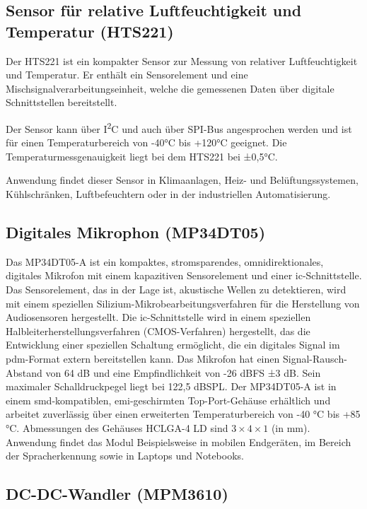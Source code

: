 \subsection{Sensor für relative Luftfeuchtigkeit und Temperatur (HTS221)}

Der HTS221 ist ein kompakter Sensor zur Messung von relativer Luftfeuchtigkeit und Temperatur. Er enthält ein Sensorelement und eine Mischsignalverarbeitungseinheit, welche die gemessenen Daten über digitale Schnittstellen bereitstellt.

Der Sensor kann über I\textsuperscript{2}C und auch über SPI-Bus angesprochen werden und ist für einen Temperaturbereich von -40°C bis +120°C geeignet. Die Temperaturmessgenauigkeit liegt bei dem HTS221 bei ±0,5°C.

Anwendung findet dieser Sensor in Klimaanlagen, Heiz- und Belüftungssystemen, Kühlschränken, Luftbefeuchtern oder in der industriellen Automatisierung. \cite{Ard.2024}
	
\subsection{Digitales Mikrophon (MP34DT05)}

Das MP34DT05-A ist ein kompaktes, stromsparendes, omnidirektionales, digitales
Mikrofon mit einem kapazitiven Sensorelement und einer \ac{ic}-Schnittstelle.
Das Sensorelement, das in der Lage ist, akustische Wellen zu detektieren, wird mit einem speziellen Silizium-Mikrobearbeitungsverfahren für die Herstellung von
Audiosensoren hergestellt. Die \ac{ic}-Schnittstelle wird in einem speziellen Halbleiterherstellungsverfahren (CMOS-Verfahren\cite{Gehrke.2022}\cite{Bernstein.2020}) hergestellt, das die Entwicklung einer speziellen Schaltung ermöglicht, die ein digitales Signal im \ac{pdm}-Format extern bereitstellen kann. Das Mikrofon hat einen Signal-Rausch-Abstand von 64 dB und eine Empfindlichkeit von -26 dBFS ±3 dB. Sein maximaler Schalldruckpegel liegt bei 122,5 dBSPL. Der MP34DT05-A ist in einem \ac{smd}-kompatiblen, \ac{emi}-geschirmten Top-Port-Gehäuse erhältlich und arbeitet zuverlässig über einen erweiterten Temperaturbereich von -40 °C bis +85 °C. Abmessungen des Gehäuses HCLGA-4 LD sind $3\times 4 \times 1$ (in mm). Anwendung findet das Modul Beispielsweise in mobilen Endgeräten, im Bereich der Spracherkennung sowie in Laptops und Notebooks.\cite{STM3.2021}\cite{Ard.2024}

\subsection{DC-DC-Wandler (MPM3610)}

